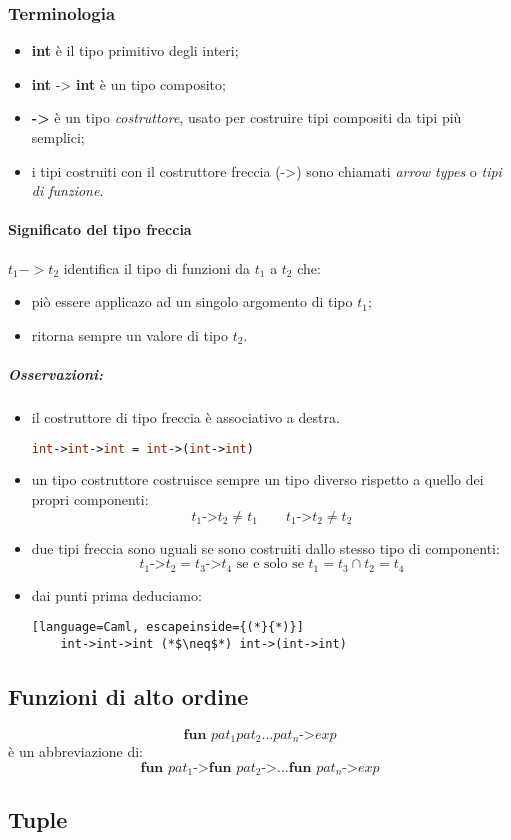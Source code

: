 \subsubsection{Terminologia}
\begin{itemize}
  \item \textbf{int} è il tipo primitivo degli interi;
  \item \textbf{int} -> \textbf{int} è un tipo composito;
  \item \textbf{->} è un tipo \textit{costruttore}, usato per costruire tipi
    compositi da tipi più semplici;
  \item i tipi costruiti con il costruttore freccia (->) sono chiamati \emph{
    arrow types} o \emph{tipi di funzione}.
\end{itemize}

\paragraph{Significato del tipo freccia}
$t_1 -> t_2$ identifica il tipo di funzioni da $t_1$ a $t_2$ che:
\begin{itemize}
  \item piò essere applicazo ad un singolo argomento di tipo $t_1$;
  \item ritorna sempre un valore di tipo $t_2$.
\end{itemize}

\subparagraph{Osservazioni:}
\begin{itemize}
  \item il costruttore di tipo freccia è associativo a destra.
    \begin{lstlisting}[language=Caml, caption={Associatività a destra dell'operatore freccia}]
    int->int->int = int->(int->int)
    \end{lstlisting}
  \item un tipo costruttore costruisce sempre un tipo diverso rispetto a quello
    dei propri componenti:
    \[
      t_1 \text{->} t_2 \neq t_1 \qquad t_1 \text{->} t_2 \neq t_2
    \]
  \item due tipi freccia sono uguali se sono costruiti dallo stesso tipo di
    componenti:
    \[
      t_1 \text{->} t_2 = t_3 \text{->} t_4 \text{ se e solo se } t_1 = t_3 \cap t_2 = t_4
    \]
  \item dai punti prima deduciamo:
    \begin{lstlisting}[language=Caml, escapeinside={(*}{*)}]
    int->int->int (*$\neq$*) int->(int->int)
    \end{lstlisting}
\end{itemize}

\subsection{Funzioni di alto ordine}
\[
  \textbf{fun } pat_1 pat_2 \dots pat_n \text{->} exp
\]
è un abbreviazione di:
\[
  \textbf{fun } pat_1 \text{->}\textbf{fun }pat_2 \text{->}\dots \textbf{fun }pat_n \text{->} exp
\]
\subsection{Tuple}

